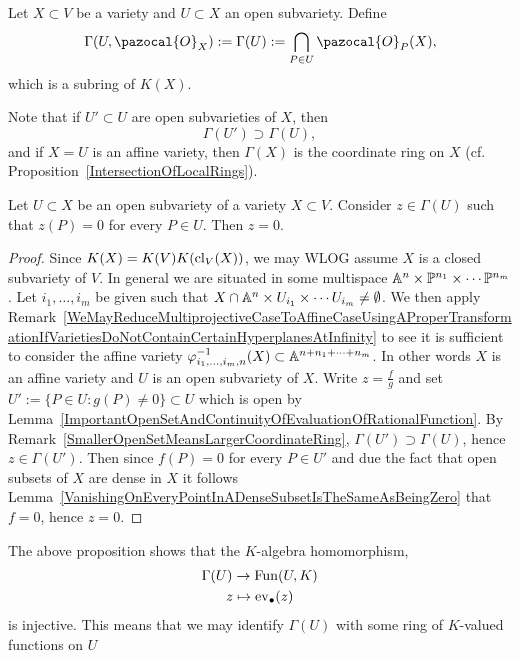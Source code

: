     \begin{definition}
        Let $X\subset V$ be a variety and $U\subset X$ an open subvariety. Define 
        $$\Gamma(U,\pazocal{O}_X):= \Gamma(U):= \bigcap_{P\in U} \pazocal{O}_P(X),$$
        which is a subring of $K(X)$.
    \end{definition}
    \begin{remark}\label{SmallerOpenSetMeansLargerCoordinateRing}
        Note that if $U'\subset U$ are open subvarieties of $X$, then 
        $$\Gamma(U')\supset \Gamma(U),$$
        and if $X=U$ is an affine variety, then $\Gamma(X)$ is the coordinate ring on $X$ (cf. Proposition~\ref{IntersectionOfLocalRings}). 
    \end{remark}
    \begin{proposition}
        Let $U\subset X$ be an open subvariety of a variety $X\subset V$. Consider $z\in \Gamma(U)$ such that $z(P) =0$ for every $P\in U$. Then $z=0$.
    \end{proposition}
    \begin{proof}
        Since $K(X)=K(V) K(\mathrm{cl}_V(X))$, we may WLOG assume $X$ is a closed subvariety of $V$. In general we are situated in some multispace $\mathbb{A}^n\times \mathbb{P}^{n_1}\times \cdots \mathbb{P}^{n_m}$. Let $i_1,\dots,i_m$ be given such that $X\cap \mathbb{A}^n\times U_{i_1}\times\cdots U_{i_m} \neq \emptyset$. We then apply Remark~\ref{WeMayReduceMultiprojectiveCaseToAffineCaseUsingAProperTransformationIfVarietiesDoNotContainCertainHyperplanesAtInfinity} to see it is sufficient to consider the affine variety $\varphi_{i_1,\dots,i_m,n}^{-1}(X)\subset \mathbb{A}^{n+n_1+\dots+n_m}$. In other words $X$ is an affine variety and $U$ is an open subvariety of $X$. Write $z=\frac{f}{g}$ and set $U':=\{ P\in U: g(P)\neq 0\}\subset U$ which is open by Lemma~\ref{ImportantOpenSetAndContinuityOfEvaluationOfRationalFunction}. By Remark~\ref{SmallerOpenSetMeansLargerCoordinateRing}, $\Gamma(U')\supset \Gamma(U)$, hence $z\in \Gamma(U')$. Then since $f(P)=0$ for every $P\in U'$ and due the fact that open subsets of $X$ are dense in $X$ it follows Lemma~\ref{VanishingOnEveryPointInADenseSubsetIsTheSameAsBeingZero} that $f=0$, hence $z=0$.
    \end{proof}
    \begin{remark}
        The above proposition shows that the $K$-algebra homomorphism, 
        \begin{gather*}
            \Gamma(U) \rightarrow \mathrm{Fun}(U,K)\\
            z \mapsto \mathrm{ev}_\bullet(z)
        \end{gather*}
        is injective. This means that we may identify $\Gamma(U)$ with some ring of $K$-valued functions on $U$
    \end{remark}
